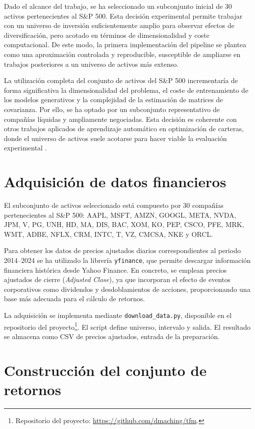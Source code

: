 Dado el alcance del trabajo, se ha seleccionado un subconjunto inicial de 30 activos pertenecientes al S\&P 500. Esta decisión experimental permite trabajar con un universo de inversión suficientemente amplio para observar efectos de diversificación, pero acotado en términos de dimensionalidad y coste computacional. De este modo, la primera implementación del pipeline se plantea como una aproximación controlada y reproducible, susceptible de ampliarse en trabajos posteriores a un universo de activos más extenso.

La utilización completa del conjunto de activos del S\&P 500 incrementaría de forma significativa la dimensionalidad del problema, el coste de entrenamiento de los modelos generativos y la complejidad de la estimación de matrices de covarianza. Por ello, se ha optado por un subconjunto representativo de compañías líquidas y ampliamente negociadas. Esta decisión es coherente con otros trabajos aplicados de aprendizaje automático en optimización de carteras, donde el universo de activos suele acotarse para hacer viable la evaluación experimental \cite{zhang2020deep}.

\section{Adquisición de datos financieros}

El subconjunto de activos seleccionado está compuesto por 30 compañías pertenecientes al S\&P 500: AAPL, MSFT, AMZN, GOOGL, META, NVDA, JPM, V, PG, UNH, HD, MA, DIS, BAC, XOM, KO, PEP, CSCO, PFE, MRK, WMT, ADBE, NFLX, CRM, INTC, T, VZ, CMCSA, NKE y ORCL.

Para obtener los datos de precios ajustados diarios correspondientes al periodo 2014--2024 se ha utilizado la librería \texttt{yfinance}, que permite descargar información financiera histórica desde Yahoo Finance. En concreto, se emplean precios ajustados de cierre (\textit{Adjusted Close}), ya que incorporan el efecto de eventos corporativos como dividendos y desdoblamientos de acciones, proporcionando una base más adecuada para el cálculo de retornos.

La adquisición se implementa mediante \texttt{download\_data.py}, disponible en el repositorio del proyecto\footnote{Repositorio del proyecto: \url{https://github.com/dmaching/tfm}.}. El script define universo, intervalo y salida. El resultado se almacena como CSV de precios ajustados, entrada de la preparación.

\section{Construcción del conjunto de retornos}

